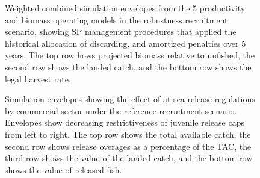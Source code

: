 \documentclass[11pt]{book}
\begin{document}
\begin{landscape}
\begin{figure}[htb]
{}

\caption{Weighted combined simulation envelopes from the 5 productivity and biomass operating models in the robustness recruitment scenario, showing SP management procedures that applied the historical allocation of discarding, and amortized penalties over 5 years. The top row hows projected biomass relative to unfished, the second row shows the landed catch, and the bottom row shows the legal harvest rate.}\label{fig:unnamed-chunk-21}
\end{figure}
\newpage
\begin{figure}[htb]

{\centering {} 

}

\caption{Simulation envelopes showing the effect of at-sea-release regulations by commercial sector under the reference recruitment scenario. Envelopes show decreasing restrictiveness of juvenile release caps from left to right. The top row shows the total available catch, the second row shows release overages as a percentage of the TAC, the third row shows the value of the landed catch, and the bottom row shows the value of released fish.}\label{fig:unnamed-chunk-23}
\end{figure}
\newpage
\begin{figure}[htb]


\end{figure}
\end{landscape}
\end{document}
